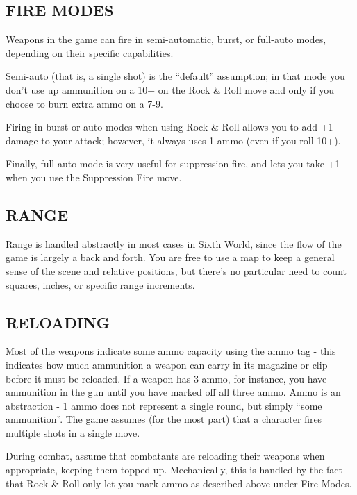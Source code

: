 \subsection*{FIRE MODES}
Weapons in the game can fire in semi-automatic, burst, or full-auto modes, depending on their specific capabilities.

Semi-auto (that is, a single shot) is the ``default'' assumption; in that mode you don't use up ammunition on a 10+ on the Rock \& Roll move and only if you choose to burn extra ammo on a 7-9.

Firing in burst or auto modes when using Rock \& Roll allows you to add +1 damage to your attack; however, it always uses 1 ammo (even if you roll 10+).

Finally, full-auto mode is very useful for suppression fire, and lets you take +1 when you use the Suppression Fire move.



\subsection*{RANGE}
Range is handled abstractly in most cases in Sixth World, since the flow of the game is largely a back and forth. You are free to use a map to keep a general sense of the scene and relative positions, but there’s no particular need to count squares, inches, or specific range increments.


\subsection*{RELOADING}
Most of the weapons indicate some ammo capacity using the ammo tag - this indicates how much ammunition a weapon can carry in its magazine or clip before it must be reloaded. If a weapon has 3 ammo, for instance, you have ammunition in the gun until you have marked off all three ammo. Ammo is an abstraction - 1 ammo does not represent a single round, but simply ``some ammunition''. The game assumes (for the most part) that a character fires multiple shots in a single move.

During combat, assume that combatants are reloading their weapons when appropriate, keeping them topped up. Mechanically, this is handled by the fact that Rock \& Roll only let you mark ammo as described above under Fire Modes.

